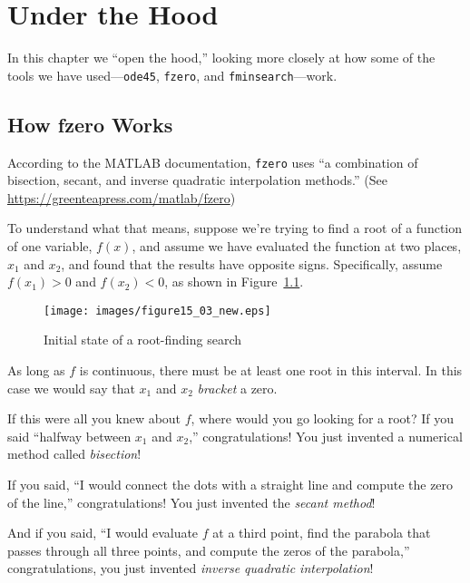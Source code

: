 \chapter{Under the Hood}
\label{how}


In this chapter we ``open the hood,'' looking more closely at how some of the tools we have used---\lstinline{ode45}, \lstinline{fzero}, and \lstinline{fminsearch}---work.



\section{How fzero Works}
\label{howfzero}

According to the MATLAB documentation, \lstinline{fzero} uses ``a combination of bisection, secant, and inverse quadratic interpolation methods.''  (See \url{https://greenteapress.com/matlab/fzero})


To understand what that means, suppose we're trying to find a root of a function of one variable, $f(x)$, and assume we have evaluated the function at two places, $x_1$ and $x_2$, and found that the results have opposite signs.  Specifically, assume $f(x_1) > 0$ and $f(x_2) < 0$, as shown in Figure~\ref{fig:secant}.

\begin{figure}[h]
\centerline{\texttt{[image: images/figure15\_03\_new.eps]}}
\caption{Initial state of a root-finding search}
\label{fig:secant}
\end{figure}

As long as $f$ is continuous, there must be at least one root in this interval.
In this case we would say that $x_1$ and $x_2$ \emph{bracket} a zero.


If this were all you knew about $f$, where would you go looking for
a root?  If you said ``halfway between $x_1$ and $x_2$,''
congratulations!  You just invented a numerical method called
\emph{bisection}!

If you said, ``I would connect the dots with a straight line
and compute the zero of the line,''
congratulations!  You just invented the \emph{secant method}!

And if you said, ``I would evaluate $f$ at a third point, find the
parabola that passes through all three points, and compute the zeros
of the parabola,'' congratulations, you just invented
\emph{inverse quadratic interpolation}!

